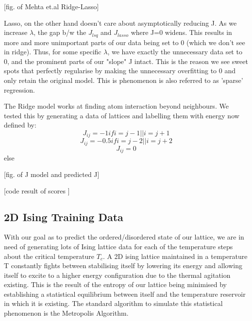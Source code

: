 [fig. of Mehta et.al Ridge-Lasso]

Lasso, on the other hand doesn't care about asymptotically reducing J. As we increase \(\lambda\), the gap b/w the \(J_{lsq}\) and \(J_{lasso}\) where J=0 widens. This results in more and more unimportant parts of our data being set to 0 (which we don't see in ridge). Thus, for some specific \(\lambda\), we have exactly the unnecessary data set to 0, and the prominent parts of our "slope" J intact. This is the reason we see sweet spots that perfectly regularise by making the unnecessary overfitting to 0 and only retain the original model. This is phenomenon is also referred to as 'sparse' regression.

The Ridge model works at finding atom interaction beyond neighbours. We tested this by generating a data of lattices and labelling them with energy now defined by:
\[J_{ij}=-1 if i=j-1 || i=j+1\]
\[J_{ij}=-0.5 if i=j-2 || i=j+2\]
\[J_{ij}=0\] else

[fig. of J model and predicted J]

[code result of scores ]

\subsection{2D Ising Training Data}
With our goal as to predict the ordered/disordered state of our lattice, we are in need of generating lots of Ising lattice data for each of the temperature steps about the critical temperature \(T_c\). A 2D ising lattice maintained in a temperature T constantly fights between stabilising itself by lowering its energy and allowing itself to excite to a higher energy configuration due to the thermal agitation existing. This is the result of the entropy of our lattice being minimised by establishing a statistical equilibrium between itself and the temperature reservoir in which it is existing. The standard algorithm to simulate this statistical phenomenon is the Metropolis Algorithm.


